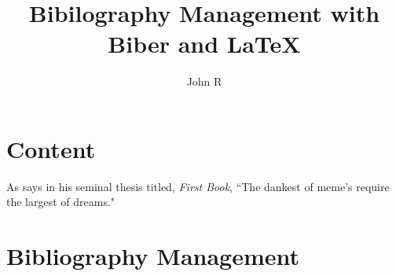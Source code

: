 \documentclass{article}
\author{John R}
\title{Bibilography Management with Biber and {\LaTeX}}
\begin{document}
\maketitle

\section{Content}
As \textcite{source} says in his seminal thesis titled, \textit{First Book}, ``The dankest of meme's require the largest of dreams."

\section{Bibliography Management}

\printbibliography
\end{document}
